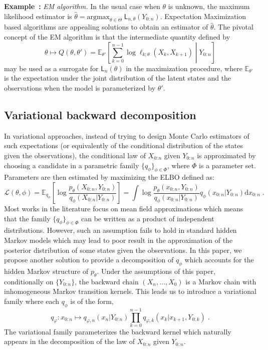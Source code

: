 \documentclass{article}
\newcommand{\1}{\mathbbm{1}}
\newcommand{\llh}[1]{\mathsf{L}_{#1}}
\newcommand{\parvec}{\theta}
\newcommand{\parspace}{\Theta}
\def\pE{\mathbb{E}}
\newcommand{\rmd}{\ensuremath{\mathrm{d}}}
\newcommand{\eqsp}{\;}
\newcommand{\qg}[1]{\ell_{#1}}
\newcounter{example}[section]
\newenvironment{example}[1][]{\refstepcounter{example}\par\medskip
   \noindent \textbf{Example~\theexample:} \textit{#1} \text \rmfamily}{\medskip}
\begin{document}
\begin{example}[EM algorithm.]
\label{ex:em:algorithm}
In the usual case when $\theta$ is unknown, the maximum likelihood estimator is $\widehat \parvec = \mathrm{argmax}_{\parvec\in\parspace}\eqsp\llh{n,\parvec}(Y_{0:n})$. Expectation Maximization based algorithms are appealing solutions to obtain an estimator of $\hat \parvec$.
The pivotal concept of the EM algorithm is that the intermediate quantity defined by
\begin{equation*}
\parvec\mapsto Q(\parvec,\parvec') = \pE_{\parvec'}\left[\sum_{k=0}^{n-1} \log \qg{k;\parvec}(X_{k}, X_{k+1})\middle | Y_{0:n}\right] 
\end{equation*}
may be used as a surrogate for $\llh{n}(\parvec)$ in the maximization procedure,  where $\pE_{\parvec'}$ is the expectation under the joint distribution of the latent states and the observations when the model is parameterized by $\parvec'$. 
\end{example}

\subsection{Variational backward decomposition}
In variational approaches, instead of trying to design Monte Carlo estimators of such expectations (or equivalently of the conditional distribution of the states given the observations), the conditional law of $X_{0:n}$ given $Y_{0:n}$ is approximated by choosing a candidate in a parametric family $\{q_\phi\}_{\phi \in \Phi}$, where $\Phi$ is a parameter set. Parameters are then estimated by maximizing the ELBO defined as:
$$
\mathcal{L}(\parvec,\phi) = \pE_{q_\phi}\left[\log \frac{p_\parvec(X_{0:n},Y_{0:n})}{q_\phi(X_{0:n}|Y_{0:n})}\right] = \int \log \frac{p_\parvec(x_{0:n},Y_{0:n})}{q_\phi(x_{0:n}|Y_{0:n})}q_\phi(x_{0:n}|Y_{0:n})\rmd x_{0:n}\eqsp.
$$
Most works in the literature focus on mean field approximations which means that the family $\{q_\phi\}_{\phi \in \Phi}$ can be written as a product of independent distributions. However, such an assumption fails to hold in standard hidden Markov models which may lead to poor result in the approximation of the posterior distribution of some states given the observations. In this paper, we propose another solution to provide a decomposition of   $q_\phi$ which accounts for the hidden Markov structure of $p_\parvec$. Under the assumptions of this paper, conditionally on $\{Y_{0:n}\}$, the backward chain $(X_n,\ldots,X_0)$ is a Markov chain with inhomogeneous Markov transition kernels. This leads us to introduce a variational family where each $q_\phi$ is of the form,
$$
q_\varphi: x_{0:n} \mapsto q_{\varphi,n}(x_n|Y_{0:n})\prod_{k=0}^{n-1}q_{\varphi,k}(x_k|x_{k+1},Y_{0:k})\eqsp.
$$
The variational family parameterizes the backward kernel which naturally appears in the decomposition of the law of $X_{0:n}$ given $Y_{0:n}$. 
\end{document}
